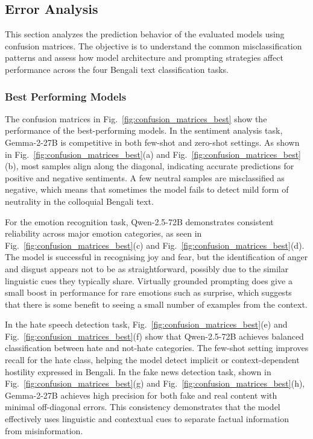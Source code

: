 \documentclass[10pt,letterpaper]{article}
\begin{document}
\subsection*{Error Analysis}

This section analyzes the prediction behavior of the evaluated models using confusion matrices. The objective is to understand the common misclassification patterns and assess how model architecture and prompting strategies affect performance across the four Bengali text classification tasks.

\subsubsection*{Best Performing Models}
\label{sec:best_performing_models}

The confusion matrices in Fig.~\ref{fig:confusion_matrices_best} show the performance of the best-performing models. In the sentiment analysis task, Gemma-2-27B is competitive in both few-shot and zero-shot settings. As shown in Fig.~\ref{fig:confusion_matrices_best}(a) and Fig.~\ref{fig:confusion_matrices_best}(b), most samples align along the diagonal, indicating accurate predictions for positive and negative sentiments. A few neutral samples are misclassified as negative, which means that sometimes the model fails to detect mild form of neutrality in the colloquial Bengali text.

For the emotion recognition task, Qwen-2.5-72B demonstrates consistent reliability across major emotion categories, as seen in Fig.~\ref{fig:confusion_matrices_best}(c) and Fig.~\ref{fig:confusion_matrices_best}(d). The model is successful in recognising joy and fear, but the identification of anger and disgust appears not to be as straightforward, possibly due to the similar linguistic cues they typically share. Virtually grounded prompting does give a small boost in performance for rare emotions such as surprise, which suggests that there is some benefit to seeing a small number of examples from the context.

In the hate speech detection task, Fig.~\ref{fig:confusion_matrices_best}(e) and Fig.~\ref{fig:confusion_matrices_best}(f) show that Qwen-2.5-72B achieves balanced classification between hate and not-hate categories. The few-shot setting improves recall for the hate class, helping the model detect implicit or context-dependent hostility expressed in Bengali. In the fake news detection task, shown in Fig.~\ref{fig:confusion_matrices_best}(g) and Fig.~\ref{fig:confusion_matrices_best}(h), Gemma-2-27B achieves high precision for both fake and real content with minimal off-diagonal errors. This consistency demonstrates that the model effectively uses linguistic and contextual cues to separate factual information from misinformation.
\end{document}
